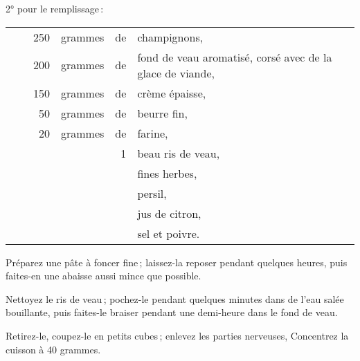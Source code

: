 2° pour le remplissage :
\footnotesize
\begin{longtable}{rrrrrp{18em}}
  & \hspace{2em} &  250 & grammes & de & champignons,                                                     \\
  & \hspace{2em} &  200 & grammes & de & fond de veau aromatisé, corsé avec de la glace de viande,        \\
  & \hspace{2em} &  150 & grammes & de & crème épaisse,                                                   \\
  & \hspace{2em} &   50 & grammes & de & beurre fin,                                                      \\
  & \hspace{2em} &   20 & grammes & de & farine,                                                          \\
  & \hspace{2em} &      &         &  1 & beau ris de veau,                                                \\
  & \hspace{2em} &      &         &    & fines herbes,                                                    \\
  & \hspace{2em} &      &         &    & persil,                                                          \\
  & \hspace{2em} &      &         &    & jus de citron,                                                   \\
  & \hspace{2em} &      &         &    & sel et poivre.                                                   \\
\end{longtable}
\normalsize

Préparez une pâte à foncer fine ; laissez-la reposer pendant quelques heures,
puis faites-en une abaisse aussi mince que possible.

Nettoyez le ris de veau ; pochez-le pendant quelques minutes dans de l'eau
salée bouillante, puis faites-le braiser pendant une demi-heure dans le fond de
veau.

Retirez-le, coupez-le en petits cubes ; enlevez les parties nerveuses,
Concentrez la cuisson à 40 grammes.

